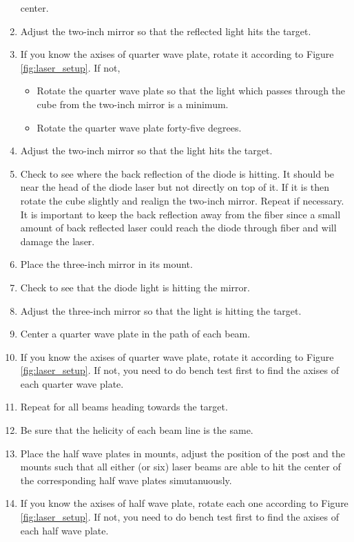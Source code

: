 \begin{enumerate}
  center.
\item Adjust the two-inch mirror so that the reflected light hits 
  the target.
\item If you know the axises of quarter wave plate, rotate it according to 
      Figure \ref{fig:laser_setup}.  If not, 
\begin{itemize}
\item Rotate the quarter wave plate so that the light which passes
  through the cube from the two-inch mirror is a minimum.
\item Rotate the quarter wave plate forty-five degrees.
\end{itemize}
\item Adjust the two-inch mirror so that the light hits the target.
\item Check to see where the back reflection of the diode is hitting. It
  should be near the head of the diode laser but not directly on top of
  it. If it is then rotate the cube slightly and realign the two-inch
  mirror. Repeat if necessary.  It is important to keep the back reflection
  away from the fiber since a small amount of back reflected laser could reach 
  the diode through fiber and will damage the laser.
\item Place the three-inch mirror in its mount.
\item Check to see that the diode light is hitting the mirror.
\item Adjust the three-inch mirror so that the light is hitting the
  target.
\item Center a quarter wave plate in the path of each beam.
\item If you know the axises of quarter wave plate, rotate it according to 
      Figure \ref{fig:laser_setup}.  If not, you need to do bench test first to 
      find the axises of each quarter wave plate.
\item Repeat for all beams heading towards the target.
\item Be sure that the helicity of each beam line is the same.
\item Place the half wave plates in mounts, adjust the position of the post 
      and the mounts such that all either (or six) laser beams are able to 
      hit the center of the corresponding half wave plates simutanuously.
\item If you know the axises of half wave plate, rotate each one according 
      to Figure \ref{fig:laser_setup}. If not, you need to do bench test first to 
      find the axises of each half wave plate.
\end{enumerate}

